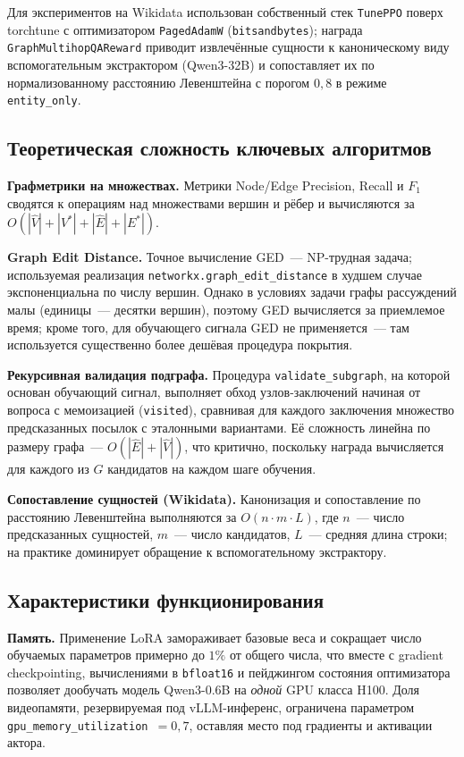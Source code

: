 Для экспериментов на Wikidata использован собственный стек \texttt{TunePPO} поверх torchtune с оптимизатором \texttt{PagedAdamW} (\texttt{bitsandbytes}); награда \texttt{GraphMultihop\allowbreak QAReward} приводит извлечённые сущности к каноническому виду вспомогательным экстрактором (Qwen3-32B) и сопоставляет их по нормализованному расстоянию Левенштейна с порогом $0{,}8$ в режиме \texttt{entity\_only}.

\subsection{Теоретическая сложность ключевых алгоритмов}
\label{subsec:impl-complexity}

\textbf{Граф\-метрики на множествах.} Метрики Node/Edge Precision, Recall и $F_1$ сводятся к операциям над множествами вершин и рёбер и вычисляются за $O(|\hat{V}| + |V^*| + |\hat{E}| + |E^*|)$.

\textbf{Graph Edit Distance.} Точное вычисление GED~--- NP-трудная задача; используемая реализация \texttt{networkx.graph\_edit\_distance} в худшем случае экспоненциальна по числу вершин. Однако в условиях задачи графы рассуждений малы (единицы~--- десятки вершин), поэтому GED вычисляется за приемлемое время; кроме того, для обучающего сигнала GED не применяется~--- там используется существенно более дешёвая процедура покрытия.

\textbf{Рекурсивная валидация подграфа.} Процедура \texttt{validate\_subgraph}, на которой основан обучающий сигнал, выполняет обход узлов-заключений начиная от вопроса с мемоизацией (\texttt{visited}), сравнивая для каждого заключения множество предсказанных посылок с эталонными вариантами. Её сложность линейна по размеру графа~--- $O(|\hat{E}| + |\hat{V}|)$, что критично, поскольку награда вычисляется для каждого из $G$ кандидатов на каждом шаге обучения.

\textbf{Сопоставление сущностей (Wikidata).} Канонизация и сопоставление по расстоянию Левенштейна выполняются за $O(n\cdot m\cdot L)$, где $n$~--- число предсказанных сущностей, $m$~--- число кандидатов, $L$~--- средняя длина строки; на практике доминирует обращение к вспомогательному экстрактору.

\subsection{Характеристики функционирования}
\label{subsec:impl-performance}

\textbf{Память.} Применение LoRA замораживает базовые веса и сокращает число обучаемых параметров примерно до $1\%$ от общего числа, что вместе с gradient checkpointing, вычислениями в \texttt{bfloat16} и пейджингом состояния оптимизатора позволяет дообучать модель Qwen3-0.6B на \emph{одной} GPU класса H100. Доля видеопамяти, резервируемая под vLLM-инференс, ограничена параметром \texttt{gpu\_memory\_utilization}~$=0{,}7$, оставляя место под градиенты и активации актора.

